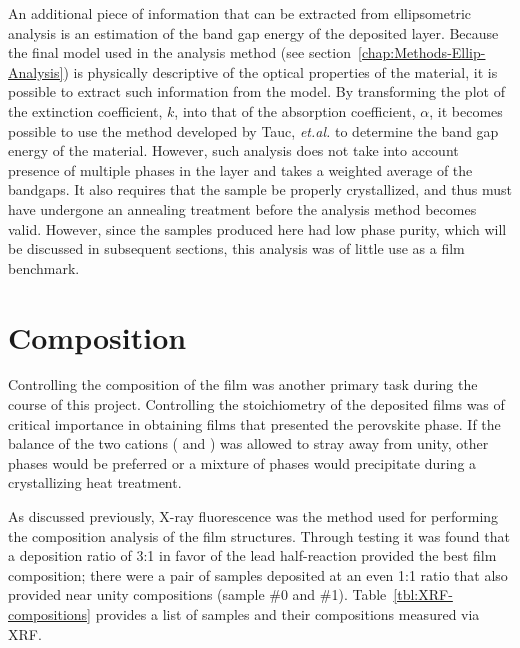 An additional piece of information that can be extracted from ellipsometric analysis is an estimation of the band gap energy of the deposited layer. Because the final model used in the analysis method (see section~\vref{chap:Methods-Ellip-Analysis}) is physically descriptive of the optical properties of the material, it is possible to extract such information from the model. By transforming the plot of the extinction coefficient, $k$, into that of the absorption coefficient, $\alpha$, it becomes possible to use the method developed by Tauc, \emph{et.al.}  to determine the band gap energy of the material. However, such analysis does not take into account presence of multiple phases in the layer and takes a weighted average of the bandgaps. It also requires that the sample be properly crystallized, and thus must have undergone an annealing treatment before the analysis method becomes valid. However, since the samples produced here had low phase purity, which will be discussed in subsequent sections, this analysis was of little use as a film benchmark. 


\section{Composition}
\label{chap:Results-Composition}

Controlling the composition of the film was another primary task during the course of this project. Controlling the stoichiometry of the deposited films was of critical importance in obtaining films that presented the perovskite phase. If the balance of the two cations (\PbIon{} and \TiIon{}) was allowed to stray away from unity, other phases would be preferred or a mixture of phases would precipitate during a crystallizing heat treatment.  

As discussed previously, X-ray fluorescence was the method used for performing the composition analysis of the film structures. Through testing it was found that a deposition ratio of 3:1 in favor of the lead half-reaction provided the best film composition; there were a pair of samples deposited at an even 1:1 ratio that also provided near unity compositions (sample \#0 and \#1). Table~\ref{tbl:XRF-compositions} provides a list of samples and their compositions measured via XRF. 


